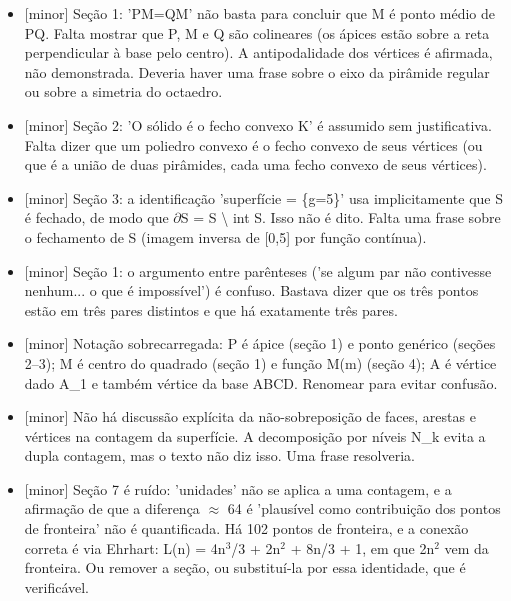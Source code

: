 \documentclass{article}%
\begin{document}
\begin{itemize}%
\item%
{[}minor{]} Seção 1: 'PM=QM' não basta para concluir que M é ponto médio de PQ. Falta mostrar que P, M e Q são colineares (os ápices estão sobre a reta perpendicular à base pelo centro). A antipodalidade dos vértices é afirmada, não demonstrada. Deveria haver uma frase sobre o eixo da pirâmide regular ou sobre a simetria do octaedro.%
\item%
{[}minor{]} Seção 2: 'O sólido é o fecho convexo K' é assumido sem justificativa. Falta dizer que um poliedro convexo é o fecho convexo de seus vértices (ou que é a união de duas pirâmides, cada uma fecho convexo de seus vértices).%
\item%
{[}minor{]} Seção 3: a identificação 'superfície = \{g=5\}' usa implicitamente que S é fechado, de modo que $\partial$S = S \textbackslash{} int S. Isso não é dito. Falta uma frase sobre o fechamento de S (imagem inversa de {[}0,5{]} por função contínua).%
\item%
{[}minor{]} Seção 1: o argumento entre parênteses ('se algum par não contivesse nenhum... o que é impossível') é confuso. Bastava dizer que os três pontos estão em três pares distintos e que há exatamente três pares.%
\item%
{[}minor{]} Notação sobrecarregada: P é ápice (seção 1) e ponto genérico (seções 2--3); M é centro do quadrado (seção 1) e função M(m) (seção 4); A é vértice dado A\_1 e também vértice da base ABCD. Renomear para evitar confusão.%
\item%
{[}minor{]} Não há discussão explícita da não{-}sobreposição de faces, arestas e vértices na contagem da superfície. A decomposição por níveis N\_k evita a dupla contagem, mas o texto não diz isso. Uma frase resolveria.%
\item%
{[}minor{]} Seção 7 é ruído: 'unidades' não se aplica a uma contagem, e a afirmação de que a diferença $\approx$ 64 é 'plausível como contribuição dos pontos de fronteira' não é quantificada. Há 102 pontos de fronteira, e a conexão correta é via Ehrhart: L(n) = 4n$^3$/3 + 2n$^2$ + 8n/3 + 1, em que 2n$^2$ vem da fronteira. Ou remover a seção, ou substituí{-}la por essa identidade, que é verificável.%
\end{itemize}%
\end{document}
